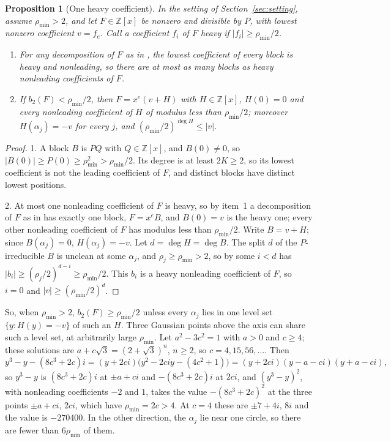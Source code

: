 \documentclass[11pt]{article}
\newtheorem{proposition}[theorem]{Proposition}
\begin{document}
\begin{proposition}[One heavy coefficient]\label{prop:gaussheavy}
In the setting of Section~\ref{sec:setting}, assume $\rho_{\min}>2$, and let
$F\in\mathbb Z[x]$ be nonzero and divisible by $P$, with lowest nonzero
coefficient $v=f_e$.  Call a coefficient $f_i$ of $F$ \emph{heavy} if
$|f_i|\ge\rho_{\min}/2$.
\begin{enumerate}
\item For any decomposition of $F$ as in \cite[Lemma~3.2]{coefficient-mass-sectors}, the
lowest coefficient of every block is heavy and nonleading, so there are at most
as many blocks as heavy nonleading coefficients of $F$.
\item If $b_2(F)<\rho_{\min}/2$, then $F=x^e(v+H)$ with $H\in\mathbb Z[x]$,
$H(0)=0$ and every nonleading coefficient of $H$ of modulus less than
$\rho_{\min}/2$; moreover $H(\alpha_j)=-v$ for every $j$, and
$(\rho_{\min}/2)^{\deg H}\le|v|$.
\end{enumerate}
\end{proposition}

\begin{proof}
1.  A block $B$ is $PQ$ with $Q\in\mathbb Z[x]$, and $B(0)\ne0$, so
$|B(0)|\ge P(0)\ge\rho_{\min}^2>\rho_{\min}/2$.  Its degree is at least $2K\ge2$,
so its lowest coefficient is not the leading coefficient of $F$, and distinct
blocks have distinct lowest positions.

2.  At most one nonleading coefficient of $F$ is heavy, so by item~1 a
decomposition of $F$ as in \cite[Lemma~3.2]{coefficient-mass-sectors} has exactly one block,
$F=x^eB$, and $B(0)=v$ is the heavy one; every other
nonleading coefficient of $F$ has modulus less than $\rho_{\min}/2$.  Write
$B=v+H$; since $B(\alpha_j)=0$, $H(\alpha_j)=-v$.  Let
$d=\deg H=\deg B$.  The split $d$ of the $P$-irreducible $B$ is unclean at
some $\alpha_j$, and $\rho_j\ge\rho_{\min}>2$, so by
\cite[Lemma~3.1]{coefficient-mass-sectors} some $i<d$ has
$|b_i|\ge(\rho_j/2)^{d-i}\ge\rho_{\min}/2$.  This $b_i$ is a heavy
nonleading coefficient of $F$, so $i=0$ and $|v|\ge(\rho_{\min}/2)^d$.
\end{proof}

So, when $\rho_{\min}>2$, $b_2(F)\ge\rho_{\min}/2$ unless every $\alpha_j$
lies in one level set $\{y:H(y)=-v\}$ of such an $H$.  Three Gaussian points
above the axis can share such a level set, at arbitrarily large
$\rho_{\min}$.  Let $a^2-3c^2=1$ with $a>0$ and $c\ge4$; these solutions are
$a+c\sqrt3=(2+\sqrt3)^n$, $n\ge2$, so $c=4,15,56,\ldots$.  Then
\[
  y^3-y-(8c^3+2c)i=(y+2ci)\bigl(y^2-2ciy-(4c^2+1)\bigr)
  =(y+2ci)(y-a-ci)(y+a-ci),
\]
so $y^3-y$ is $(8c^3+2c)i$ at $\pm a+ci$ and $-(8c^3+2c)i$ at $2ci$, and
$(y^3-y)^2$, with nonleading coefficients $-2$ and $1$, takes the value
$-(8c^3+2c)^2$ at the three points $\pm a+ci$, $2ci$, which have
$\rho_{\min}=2c>4$.  At $c=4$ these are $\pm7+4i$, $8i$ and the value is
$-270400$.  In the other direction, the $\alpha_j$ lie near one circle, so
there are fewer than $6\rho_{\min}$ of them.
\end{document}
